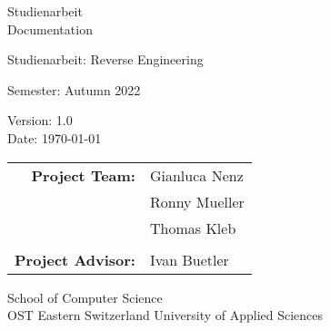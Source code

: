 \begin{titlepage}

    \begin{center}

        \vspace{1 cm}

        {\Large Studienarbeit \\ Documentation} \\

        \vspace{0.5cm}

        {\Huge Studienarbeit: Reverse Engineering}

        \vspace{0.5cm}

        Semester: Autumn 2022

        \vspace{1 cm}

        Version: 1.0 \\
        Date: \today \\
        \vspace{1 cm}

        \begin{tabular}{rl}
            \textbf{Project Team:}    & Gianluca Nenz \\
                                      & Ronny Mueller \\
                                      & Thomas Kleb \\
                                      &                    \\
            \textbf{Project Advisor:} & Ivan Buetler
        \end{tabular}

        \vfill


        \vspace{1cm}
        School of Computer Science\\
        OST Eastern Switzerland University of Applied Sciences

    \end{center}

\end{titlepage}